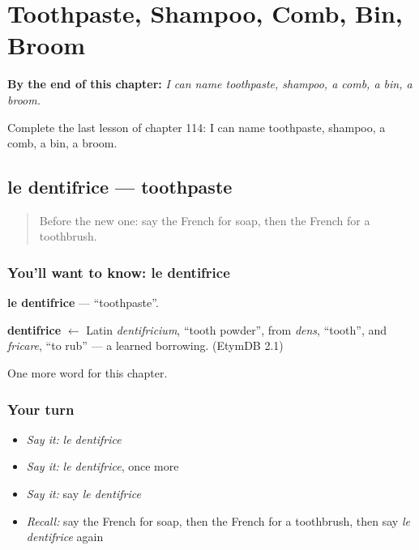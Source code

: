 
\chapter{Toothpaste, Shampoo, Comb, Bin, Broom}
\label{ch:fr-toothpaste-shampoo-comb-bin-broom}

\begin{chapteropening}
\textbf{By the end of this chapter:} \emph{I can name toothpaste, shampoo, a comb, a bin, a broom.}

Complete the last lesson of chapter 114: I can name toothpaste, shampoo, a comb, a bin, a broom.
\end{chapteropening}

\section[le dentifrice]{le dentifrice — toothpaste}

\label{lesson:FR-C114-dentifrice}



\begin{quote}
Before the new one: say the French for soap, then the French for a toothbrush.
\end{quote}

\subsection*{You'll want to know: le dentifrice}
\textbf{le dentifrice} — \textquotedblleft{}toothpaste\textquotedblright{}.

\begin{cousinweb}
\textbf{dentifrice} $\leftarrow$ Latin \emph{dentifricium}, \textquotedblleft{}tooth powder\textquotedblright{}, from \emph{dens}, \textquotedblleft{}tooth\textquotedblright{}, and \emph{fricare}, \textquotedblleft{}to rub\textquotedblright{} — a learned borrowing. (EtymDB 2.1)
\end{cousinweb}

\begin{grammarlens}[title={What you've built}]
One more word for this chapter.
\end{grammarlens}

\subsection*{Your turn}
\begin{itemize}
\raggedright
  \item \emph{Say it:} \emph{le dentifrice}
  \item \emph{Say it:} \emph{le dentifrice}, once more
  \item \emph{Say it:} say \emph{le dentifrice}
  \item \emph{Recall:} say the French for soap, then the French for a toothbrush, then say \emph{le dentifrice} again
\end{itemize}

